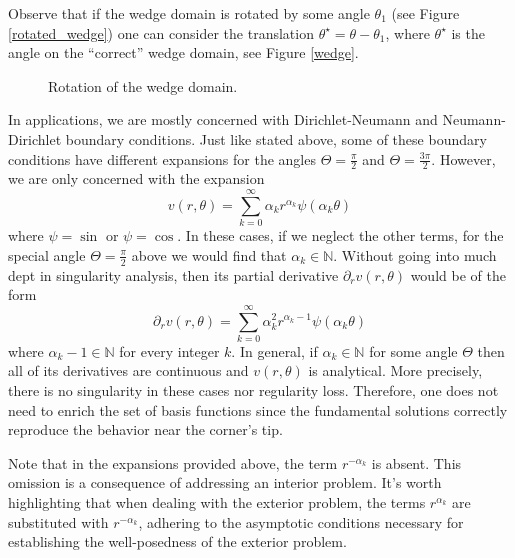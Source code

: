 \begin{remark}\label{particular_solutions}
    Observe that if the wedge domain is rotated by some angle \(\theta_1\) (see Figure \eqref{rotated_wedge}) one can consider the translation \(\theta^\star = \theta - \theta_1\), where \(\theta^\star\) is the angle on the ``correct'' wedge domain, see Figure \eqref{wedge}. 
    \begin{figure}[H]
        \centering
        \caption{Rotation of the wedge domain.}
        \label{rotated_wedge}
    \end{figure}
    In applications, we are mostly concerned with Dirichlet-Neumann and Neumann-Dirichlet boundary conditions. Just like stated above, some of these boundary conditions have different expansions for the angles \(\Theta=\frac{\pi}{2}\) and \(\Theta=\frac{3\pi}{2}\). However, we are only concerned with the expansion
    \[
        v(r,\theta) = \sum_{k=0}^{\infty}\alpha_k r^{\alpha_k}\psi(\alpha_k \theta)
    \]
    where \(\psi=\sin\) or \(\psi = \cos\). In these cases, if we neglect the other terms, for the special angle \(\Theta = \frac{\pi}{2}\) above we would find that \(\alpha_k \in \mathbb{N}\). Without going into much dept in singularity analysis, then its partial derivative \(\partial_r v(r,\theta)\) would be of the form 
    \[
        \partial_r v(r,\theta) = \sum_{k=0}^{\infty}\alpha_k^2 r^{\alpha_k-1}\psi(\alpha_k \theta)
    \]
    where \(\alpha_k-1 \in \mathbb{N}\) for every integer \(k\). In general, if \(\alpha_k \in \mathbb{N}\) for some angle \(\Theta\) then all of its derivatives are continuous and \(v(r,\theta)\) is analytical. More precisely, there is no singularity in these cases nor regularity loss. Therefore, one does not need to enrich the set of basis functions since the fundamental solutions correctly reproduce the behavior near the corner's tip.
    
    Note that in the expansions provided above, the term $r^{-\alpha_k}$ is absent. This omission is a consequence of addressing an interior problem. It's worth highlighting that when dealing with the exterior problem, the terms $r^{\alpha_k}$ are substituted with $r^{-\alpha_k}$, adhering to the asymptotic conditions necessary for establishing the well-posedness of the exterior problem.
\end{remark}

